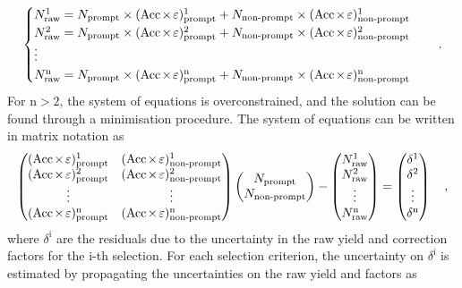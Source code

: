 \begin{equation*}
    \begin{cases}
        N_\mathrm{raw}^1 = N_\mathrm{prompt}\times\aeffp^1 + N_\mathrm{non\text{-}prompt} \times \aeffnp^1\\
        N_\mathrm{raw}^2 = N_\mathrm{prompt}\times\aeffp^2 + N_\mathrm{non\text{-}prompt} \times \aeffnp^2\\
        \vdots\\
        N_\mathrm{raw}^\mathrm{n} = N_\mathrm{prompt}\times\aeffp^\mathrm{n} + N_\mathrm{non\text{-}prompt} \times \aeffnp^\mathrm{n}
    \end{cases}
    \quad .
\end{equation*}
For $\mathrm{n>2}$, the system of equations is overconstrained, and the solution can be found through a minimisation procedure. The system of equations can be written in matrix notation as
\begin{equation*}
    \begin{pmatrix}
        \aeffp^1 & \aeffnp^1\\
        \aeffp^2 & \aeffnp^2\\
        \vdots & \vdots\\
        \aeffp^\mathrm{n} & \aeffnp^\mathrm{n}
    \end{pmatrix}
    \begin{pmatrix}
        N_\mathrm{prompt}\\
        N_\mathrm{non\text{-}prompt}
    \end{pmatrix}
    -
    \begin{pmatrix}
        N_\mathrm{raw}^1\\
        N_\mathrm{raw}^2\\
        \vdots\\
        N_\mathrm{raw}^\mathrm{n}
    \end{pmatrix}
    =
    \begin{pmatrix}
        \delta^1\\
        \delta^2\\
        \vdots\\
        \delta^\mathrm{n}
    \end{pmatrix}
    \quad ,
\end{equation*}
where $\delta^\mathrm{i}$ are the residuals due to the uncertainty in the raw yield and \aeff correction factors for the i-th selection. For each selection criterion, the uncertainty on $\delta^\mathrm{i}$ is estimated by propagating the uncertainties on the raw yield and \aeff factors as
